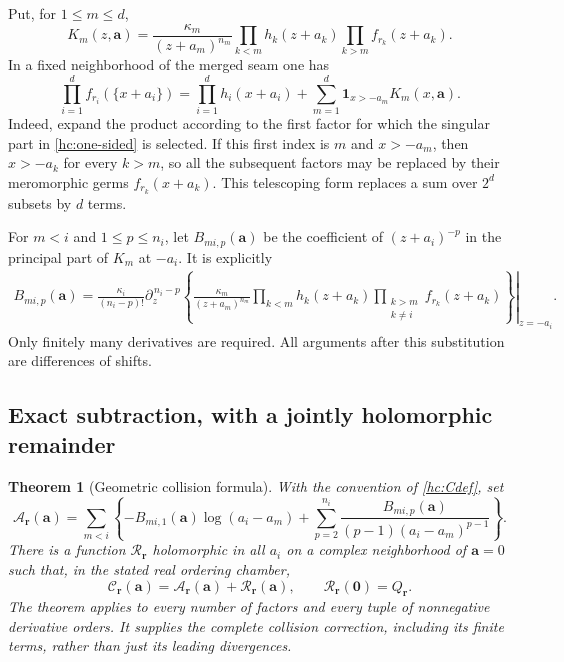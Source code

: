 \documentclass[11pt,a4paper]{article}
\numberwithin{equation}{section}
\newtheorem{theorem}{Theorem}[section]
\theoremstyle{definition}
\theoremstyle{remark}
\begin{document}
Put, for $1\le m\le d$,
\begin{equation}\label{hc:Km}
 K_m(z,\boldsymbol a)=
 \frac{\kappa_m}{(z+a_m)^{n_m}}
 \prod_{k<m}h_k(z+a_k)
 \prod_{k>m}f_{r_k}(z+a_k).
\end{equation}
In a fixed neighborhood of the merged seam one has
\begin{equation}\label{hc:telescope}
 \prod_{i=1}^d f_{r_i}(\{x+a_i\})
 =\prod_{i=1}^d h_i(x+a_i)
      +\sum_{m=1}^d\mathbf1_{x>-a_m}K_m(x,\boldsymbol a).
\end{equation}
Indeed, expand the product according to the first factor for which the
singular part in \eqref{hc:one-sided} is selected. If this first index is
$m$ and $x>-a_m$, then $x>-a_k$ for every $k>m$, so all the subsequent
factors may be replaced by their meromorphic germs $f_{r_k}(x+a_k)$.
This telescoping form replaces a sum over $2^d$ subsets by $d$ terms.

For $m<i$ and $1\le p\le n_i$, let $B_{mi,p}(\boldsymbol a)$ be the
coefficient of $(z+a_i)^{-p}$ in the principal part of $K_m$ at $-a_i$.
It is explicitly
\begin{align}
 B_{mi,p}(\boldsymbol a)
 =\frac{\kappa_i}{(n_i-p)!}
 \left.\partial_z^{\,n_i-p}\left\{
 \frac{\kappa_m}{(z+a_m)^{n_m}}
 \prod_{k<m}h_k(z+a_k)
 \prod_{\substack{k>m\\k\ne i}}f_{r_k}(z+a_k)
 \right\}\right|_{z=-a_i}.
 \label{hc:B}
\end{align}
Only finitely many derivatives are required. All arguments after
this substitution are differences of shifts.

\subsection{Exact subtraction, with a jointly holomorphic remainder}

\begin{theorem}[Geometric collision formula]\label{hc:main}
With the convention of \eqref{hc:Cdef}, set
\begin{equation}\label{hc:counter}
 \mathcal A_{\boldsymbol r}(\boldsymbol a)=
 \sum_{m<i}\left\{
 -B_{mi,1}(\boldsymbol a)\log(a_i-a_m)
 +\sum_{p=2}^{n_i}
  \frac{B_{mi,p}(\boldsymbol a)}{(p-1)(a_i-a_m)^{p-1}}
 \right\}.
\end{equation}
There is a function $\mathcal R_{\boldsymbol r}$ holomorphic in all
$a_i$ on a complex neighborhood of $\boldsymbol a=0$ such that, in
the stated real ordering chamber,
\begin{equation}\label{hc:exact}
 \boxed{\quad
 \mathcal C_{\boldsymbol r}(\boldsymbol a)
 =\mathcal A_{\boldsymbol r}(\boldsymbol a)
       +\mathcal R_{\boldsymbol r}(\boldsymbol a),\qquad
 \mathcal R_{\boldsymbol r}(\boldsymbol0)=Q_{\boldsymbol r}.
 \quad}
\end{equation}
The theorem applies to every number of factors and every tuple of
nonnegative derivative orders. It supplies the complete collision
correction, including its finite terms, rather than just its leading
divergences.
\end{theorem}
\end{document}
